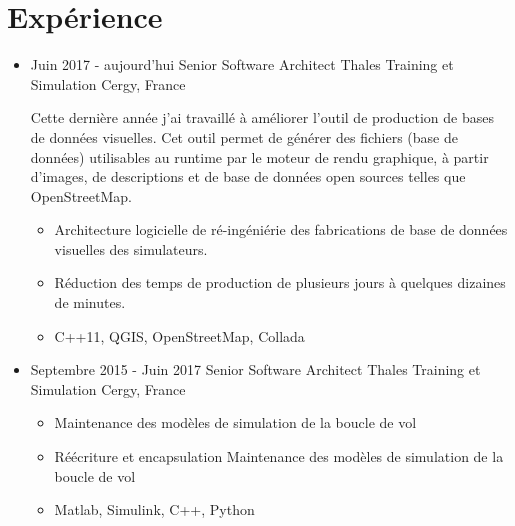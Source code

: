 
\section{Expérience}


\begin{itemize}

\item{
\cventrylc
{Juin 2017 - aujourd'hui} %
{Senior Software Architect} %
{Thales Training et Simulation} %
{Cergy, France} %
{}
{ %
\myvspace
Cette dernière année j'ai travaillé à améliorer l'outil de production de bases de données visuelles. Cet outil permet de générer des fichiers
(base de données) utilisables au runtime par le moteur de rendu graphique, à partir d'images, de descriptions et de base de données open sources
telles que OpenStreetMap.
\myvspace
\begin{itemize}
\item {Architecture logicielle de ré-ingéniérie des fabrications de base de données visuelles des simulateurs.}
\item {Réduction des temps de production de plusieurs jours à quelques dizaines de minutes.}
\item {C++11, QGIS, OpenStreetMap, Collada}
\end{itemize}
}
{
}
}
\item{
\cventrylc
{Septembre 2015 - Juin 2017} %
{Senior Software Architect} %
{Thales Training et Simulation} %
{Cergy, France} %
{}
{ %
\begin{itemize}
\item {Maintenance des modèles de simulation de la boucle de vol}
\item {Réécriture et encapsulation Maintenance des modèles de simulation de la boucle de vol}
\item {Matlab, Simulink, C++, Python}
\end{itemize}
}
}




\end{itemize}